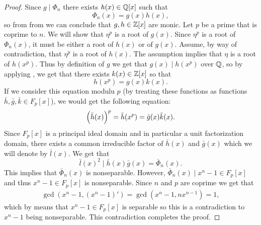 \documentclass[11pt,a4paper]{article}
\begin{document}
\begin{proof}
  Since $g \mid \Phi_n$ there exists $h(x) \in \mathbb{Q}[x]$ such that
  \[
    \Phi_n(x) = g(x) h(x),
  \]
  so from from  we can
  conclude that $g,h \in \mathbb{Z}[x]$ are monic.
  Let $p$ be a prime that is coprime to $n$.
  We will show that $\eta^p$ is a root of $g(x)$.
  Since $\eta^p$ is a root of $\Phi_n(x)$,
  it must be either a root of $h(x)$ or of $g(x)$.
  Assume, by way of contradiction, that $\eta^p$ is a root of $h(x)$.
  The assumption implies that $\eta$ is a root of $h(x^p)$.
  Thus by definition of $g$ we get that $g(x) \mid h(x^p)$ over $\mathbb{Q}$,
  so by applying ,
  we get that there exists $k(x) \in \mathbb{Z}[x]$ so that
  \[
    h(x^p) = g(x) k(x).
  \]
  If we consider this equation modulu $p$
  (by treating these functions
  as functions $\bar h, \bar g, \bar k \in F_p[x]$),
  we would get the following equation:
  \[
    \del{\bar h(x)}^p =
    \bar h(x^p) =
    \bar g(x) \bar k(x).
  \]
  Since $F_p[x]$ is a principal ideal domain and
  in particular a unit factorization domain,
  there exists a common irreducible factor of $\bar h(x)$ and $\bar g(x)$
  which we will denote by $\bar l(x)$.
  We get that
  \[
    \bar l(x)^2 \mid
    \bar h(x) \bar g(x) =
    \bar \Phi_n(x).
  \]
  This implies that $\bar \Phi_n(x)$ is nonseparable.
  However, $\bar \Phi_n(x) \mid x^n - 1 \in F_p[x]$
  and thus $x^n - 1 \in F_p[x]$ is nonseparable.
  Since $n$ and $p$ are coprime we get that
  \begin{gather*}
    \gcd(x^n - 1,(x^n - 1)') =
    \gcd(x^n - 1,n x^{n-1}) = 1,
  \end{gather*}
  which by  means that $x^n - 1 \in F_p[x]$ 
  is separable so this is a contradiction to $x^n - 1$ being nonseparable.
  This contradiction completes the proof.
\end{proof}
\end{document}
